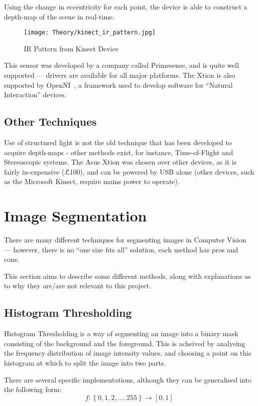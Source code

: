 Using the change in eccentricity for each point, the device is able to construct a depth-map of the scene in real-time.

\begin{figure}[H]
\centering
\texttt{[image: Theory/kinect\_ir\_pattern.jpg]}
\caption{IR Pattern from Kinect Device~\cite{primesense-irstream}}
\end{figure}

This sensor was developed by a company called Primesense, and is quite well supported --- drivers are available for all major platforms. The Xtion is also supported by OpenNI~\cite{openni}, a framework used to develop software for ``Natural Interaction'' devices. 

\subsection{Other Techniques}
Use of structured light is not the old technique that has been developed to acquire depth-maps - other methods exist, for instance, Time-of-Flight and Stereoscopic systems. The Asus Xtion was chosen over other devices, as it is fairly in-expensive (\~£100), and can be powered by USB alone (other devices, such as the Microsoft Kinect, require mains power to operate). 

\section{Image Segmentation}
There are many different techniques for segmenting images in Computer Vision --- however, there is no ``one size fits all'' solution, each method has pros and cons. 

This section aims to describe some different methods, along with explanations as to why they are/are not relevant to this project.

\subsection{Histogram Thresholding} 
Histogram Thresholding is a way of segmenting an image into a binary mask consisting of the background and the foreground. This is acheived by analysing the frequency distribution of image intensity values, and choosing a point on this histogram at which to split the image into two parts.  

There are several specific implementations, although they can be generalised into the following form:
\begin{equation}
f: \left\{{0,1,2,...,255}\right\} \rightarrow [0, 1]
\end{equation}

